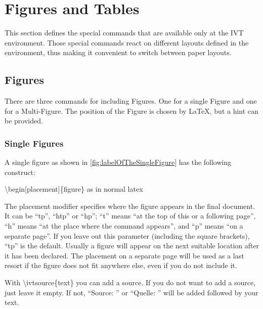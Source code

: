 %
\section{Figures and Tables}
%

This section defines the
special commands that are available only at the IVT environment.
Those special commands
react on different layouts defined in the environment,
thus making it convenient to switch between paper layouts.

\subsection{Figures} \label{sec:compStructs-Figures}

There are three commands for including Figures. One for a single Figure
and one for a Multi-Figure. The position of the Figure is chosen by
\LaTeX,
but a hint can be provided.

\subsubsection{Single Figures}

\label{sec:compStructs-Figures-SingleFigures}

A single figure as shown in \cref{fig:labelOfTheSingleFigure}
has the following construct:

\textbackslash{}begin[placement]\{figure\} as in normal latex 

The placement modifier 
specifies where the figure appears in the final document.
It can be ``tp'', ``htp'' or ``hp'';
``t'' means ``at the top of this or a following page'',
``h'' means ``at the place where the command appears'',
and ``p'' means ``on a separate page''.
If you leave out this parameter (including the square brackets),
``tp'' is the default.
Usually a figure will appear on the next suitable location
after it has been declared.
The placement on a separate page will be used as a last resort
if the figure does not fit anywhere else, even if you do not include it.

With \textbackslash{}ivtsource\{text\} you can add a source. If you do not want
to add a source, just leave it empty. If not, ``Source: '' or
``Quelle: '' will be added followed by your text.


